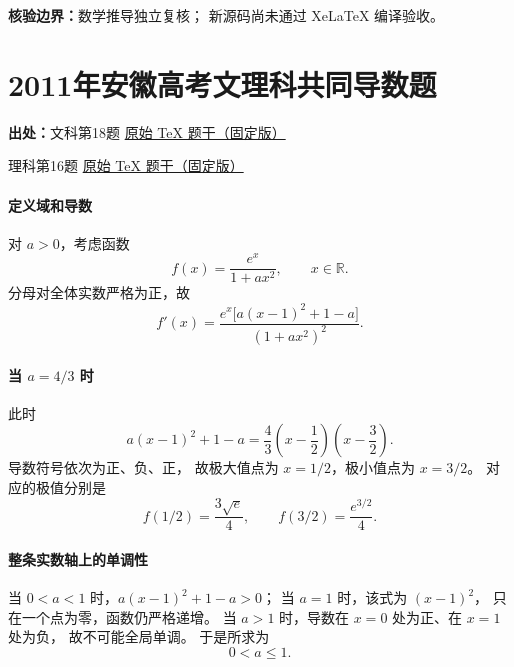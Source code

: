\documentclass[UTF8,a4paper,11pt]{ctexart}
\begin{document}
\noindent\textbf{核验边界：}数学推导独立复核；
新源码尚未通过 XeLaTeX 编译验收。

\clearpage
{}
{}
\section*{2011年安徽高考文理科共同导数题}
\noindent\textbf{出处：}文科第18题 \href{https://github.com/DxAThing/Gaokao-Math-Problems-Compilation/blob/f1ae169b58a75b3db6e35c670b3f0d5c78718188/content/2011/anhui_liberal.tex#L447}{原始 TeX 题干（固定版）}

\noindent 理科第16题 \href{https://github.com/DxAThing/Gaokao-Math-Problems-Compilation/blob/f1ae169b58a75b3db6e35c670b3f0d5c78718188/content/2011/anhui_science.tex#L362}{原始 TeX 题干（固定版）}

\paragraph{定义域和导数}
对 $a>0$，考虑函数
\[
f(x)=\frac{e^x}{1+ax^2},\qquad x\in\mathbb R.
\]
分母对全体实数严格为正，故
\[
f'(x)=\frac{e^x\bigl[a(x-1)^2+1-a\bigr]}{(1+ax^2)^2}.
\]

\paragraph{当 $a=4/3$ 时}
此时
\[
a(x-1)^2+1-a
=\frac43\left(x-\frac12\right)\left(x-\frac32\right).
\]
导数符号依次为正、负、正，
故极大值点为 $x=1/2$，极小值点为 $x=3/2$。
对应的极值分别是
\[
f(1/2)=\frac{3\sqrt e}{4},\qquad
f(3/2)=\frac{e^{3/2}}4.
\]

\paragraph{整条实数轴上的单调性}
当 $0<a<1$ 时，$a(x-1)^2+1-a>0$；
当 $a=1$ 时，该式为 $(x-1)^2$，
只在一个点为零，函数仍严格递增。
当 $a>1$ 时，导数在 $x=0$ 处为正、在 $x=1$ 处为负，
故不可能全局单调。
于是所求为
\[
\boxed{0<a\le1}.
\]
\end{document}
